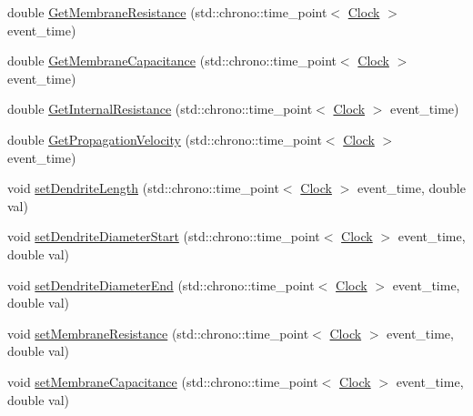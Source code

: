 \begin{DoxyCompactItemize}
\item 
double \mbox{\hyperlink{classDendrite_ab70008318cada82e0f21f8f010858eaa}{Get\+Membrane\+Resistance}} (std\+::chrono\+::time\+\_\+point$<$ \mbox{\hyperlink{universe_8h_a0ef8d951d1ca5ab3cfaf7ab4c7a6fd80}{Clock}} $>$ event\+\_\+time)
\item 
double \mbox{\hyperlink{classDendrite_a3551fe5fcf9c7ec767a6171f61a5ba51}{Get\+Membrane\+Capacitance}} (std\+::chrono\+::time\+\_\+point$<$ \mbox{\hyperlink{universe_8h_a0ef8d951d1ca5ab3cfaf7ab4c7a6fd80}{Clock}} $>$ event\+\_\+time)
\item 
double \mbox{\hyperlink{classDendrite_a7dd00ac5440edf9943389951a275b9bc}{Get\+Internal\+Resistance}} (std\+::chrono\+::time\+\_\+point$<$ \mbox{\hyperlink{universe_8h_a0ef8d951d1ca5ab3cfaf7ab4c7a6fd80}{Clock}} $>$ event\+\_\+time)
\item 
double \mbox{\hyperlink{classDendrite_af0315957a349532d25691385b6486e95}{Get\+Propagation\+Velocity}} (std\+::chrono\+::time\+\_\+point$<$ \mbox{\hyperlink{universe_8h_a0ef8d951d1ca5ab3cfaf7ab4c7a6fd80}{Clock}} $>$ event\+\_\+time)
\item 
void \mbox{\hyperlink{classDendrite_a9bc84d369ac487b095ed1641f89469d2}{set\+Dendrite\+Length}} (std\+::chrono\+::time\+\_\+point$<$ \mbox{\hyperlink{universe_8h_a0ef8d951d1ca5ab3cfaf7ab4c7a6fd80}{Clock}} $>$ event\+\_\+time, double val)
\item 
void \mbox{\hyperlink{classDendrite_af33658a5420b56cfd321d75ae5784302}{set\+Dendrite\+Diameter\+Start}} (std\+::chrono\+::time\+\_\+point$<$ \mbox{\hyperlink{universe_8h_a0ef8d951d1ca5ab3cfaf7ab4c7a6fd80}{Clock}} $>$ event\+\_\+time, double val)
\item 
void \mbox{\hyperlink{classDendrite_ada331daa4464ae007b3f77612aa46937}{set\+Dendrite\+Diameter\+End}} (std\+::chrono\+::time\+\_\+point$<$ \mbox{\hyperlink{universe_8h_a0ef8d951d1ca5ab3cfaf7ab4c7a6fd80}{Clock}} $>$ event\+\_\+time, double val)
\item 
void \mbox{\hyperlink{classDendrite_af6141643bf2c85404ae9c320611d1d31}{set\+Membrane\+Resistance}} (std\+::chrono\+::time\+\_\+point$<$ \mbox{\hyperlink{universe_8h_a0ef8d951d1ca5ab3cfaf7ab4c7a6fd80}{Clock}} $>$ event\+\_\+time, double val)
\item 
void \mbox{\hyperlink{classDendrite_a6fed149ffe00cf781a41a9f260f8eeb2}{set\+Membrane\+Capacitance}} (std\+::chrono\+::time\+\_\+point$<$ \mbox{\hyperlink{universe_8h_a0ef8d951d1ca5ab3cfaf7ab4c7a6fd80}{Clock}} $>$ event\+\_\+time, double val)
\item 

\end{DoxyCompactItemize}
